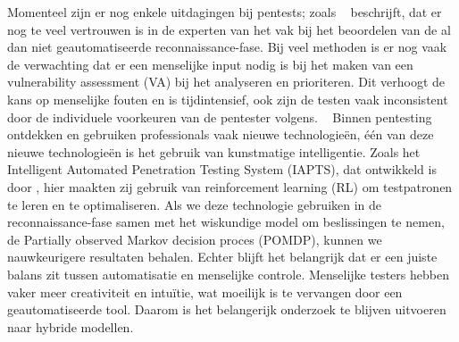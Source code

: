 Momenteel zijn er nog enkele uitdagingen bij pentests; zoals ~\textcite{Fugkeaw} beschrijft, dat er nog te veel vertrouwen is  
in de experten van het vak bij het beoordelen van de al dan niet geautomatiseerde reconnaissance-fase. Bij veel methoden is er nog vaak de verwachting dat er een menselijke input nodig is bij het maken van een vulnerability assessment (VA) bij het analyseren en prioriteren. Dit verhoogt de kans op menselijke fouten en is tijdintensief, ook zijn de testen vaak inconsistent door de individuele voorkeuren van de pentester volgens. ~\textcite{Ghanem}
Binnen pentesting ontdekken en gebruiken professionals vaak nieuwe technologieën, één van deze nieuwe technologieën is het gebruik van kunstmatige intelligentie. Zoals het Intelligent Automated Penetration Testing System (IAPTS), dat ontwikkeld is door \textcite{Ghanem}, hier maakten zij gebruik van reinforcement learning (RL) om testpatronen te leren en te optimaliseren. Als we deze technologie gebruiken in de reconnaissance-fase samen met het wiskundige model om beslissingen te nemen, de Partially observed Markov decision proces (POMDP), kunnen we nauwkeurigere resultaten behalen. Echter blijft het belangrijk dat er een juiste balans zit tussen automatisatie en menselijke controle. Menselijke testers hebben vaker meer creativiteit en intuïtie, wat moeilijk is te vervangen door een geautomatiseerde tool. Daarom is het belangerijk onderzoek te blijven uitvoeren naar hybride modellen.  








